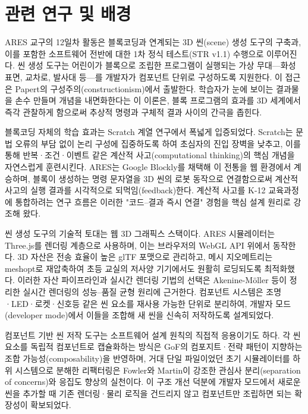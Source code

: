 

\section{관련 연구 및 배경}

ARES 교구의 12일차 활동은 블록코딩과 연계되는 3D 씬(scene) 생성 도구의 구축과, 이를 포함한 소프트웨어 전반에 대한 1차 정식 테스트(STR v1.1) 수행으로 이루어진다. 씬 생성 도구는 어린이가 블록으로 조립한 프로그램이 실행되는 가상 무대—화성 표면, 교차로, 발사대 등—를 개발자가 컴포넌트 단위로 구성하도록 지원한다. 이 접근은 Papert의 구성주의(constructionism)에서 출발한다. 학습자가 눈에 보이는 결과물을 손수 만들며 개념을 내면화한다는 이 이론은\cite{papert1980}, 블록 프로그램의 효과를 3D 세계에서 즉각 관찰하게 함으로써 추상적 명령과 구체적 결과 사이의 간극을 좁힌다.

블록코딩 자체의 학습 효과는 Scratch 계열 연구에서 폭넓게 입증되었다. Scratch는 문법 오류의 부담 없이 논리 구성에 집중하도록 하여 초심자의 진입 장벽을 낮추고\cite{resnick2009scratch,maloney2010scratch}, 이를 통해 반복·조건·이벤트 같은 계산적 사고(computational thinking)의 핵심 개념을 자연스럽게 훈련시킨다\cite{wing2006ct,brennan2012ct}. ARES는 Google Blockly를 채택해 이 전통을 웹 환경에서 계승하며\cite{blockly}, 블록이 생성하는 명령 문자열을 3D 씬의 로봇 동작으로 연결함으로써 계산적 사고의 실행 결과를 시각적으로 되먹임(feedback)한다. 계산적 사고를 K-12 교육과정에 통합하려는 연구 흐름은 이러한 "코드–결과 즉시 연결" 경험을 핵심 설계 원리로 강조해 왔다\cite{grover2013ct}.

씬 생성 도구의 기술적 토대는 웹 3D 그래픽스 스택이다. ARES 시뮬레이터는 Three.js를 렌더링 계층으로 사용하며\cite{threejs}, 이는 브라우저의 WebGL API 위에서 동작한다\cite{webgl}. 3D 자산은 전송 효율이 높은 glTF 포맷으로 관리하고\cite{gltf}, 메시 지오메트리는 meshopt로 재압축하여 초등 교실의 저사양 기기에서도 원활히 로딩되도록 최적화했다\cite{meshopt}. 이러한 자산 파이프라인과 실시간 렌더링 기법의 선택은 Akenine-Möller 등이 정리한 실시간 렌더링의 성능–품질 균형 원리에 근거한다\cite{akenine2018realtime}. 컴포넌트 시스템은 조명·LED·로켓·신호등 같은 씬 요소를 재사용 가능한 단위로 분리하여, 개발자 모드(developer mode)에서 이들을 조합해 새 씬을 신속히 저작하도록 설계되었다.

컴포넌트 기반 씬 저작 도구는 소프트웨어 설계 원칙의 직접적 응용이기도 하다. 각 씬 요소를 독립적 컴포넌트로 캡슐화하는 방식은 GoF의 컴포지트·전략 패턴이 지향하는 조합 가능성(composability)을 반영하며\cite{gof1994}, 거대 단일 파일이었던 초기 시뮬레이터를 하위 시스템으로 분해한 리팩터링은 Fowler와 Martin이 강조한 관심사 분리(separation of concerns)와 응집도 향상의 실천이다\cite{fowler2018refactoring,martin2008cleancode}. 이 구조 개선 덕분에 개발자 모드에서 새로운 씬을 추가할 때 기존 렌더링·물리 로직을 건드리지 않고 컴포넌트만 조립하면 되는 확장성이 확보되었다.

